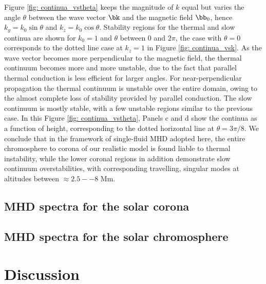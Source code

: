 Figure \ref{fig: continua_vstheta} keeps the magnitude of $k$ equal but varies the angle $\theta$ between the wave vector $\bk$ and the magnetic field $\bb_0$, hence $k_y = k_0\sin\theta$ and $k_z = k_0\cos\theta$. Stability regions for the thermal and slow continua are shown for $k_0 = 1$ and $\theta$ between 0 and $2\pi$, the case with $\theta = 0$ corresponds to the dotted line case at $k_z = 1$ in Figure \ref{fig: continua_vsk}. As the wave vector becomes more perpendicular to the magnetic field, the thermal continuum becomes more and more unstable, due to the fact that parallel thermal conduction is less efficient for larger angles. For near-perpendicular propagation the thermal continuum is unstable over the entire domain, owing to the almost complete loss of stability provided by parallel conduction. The slow continuum is mostly stable, with a few unstable regions similar to the previous case. In this Figure \ref{fig: continua_vstheta}, Panels c and d show the continua as a function of height, corresponding to the dotted horizontal line at $\theta = 3\pi/8$. We conclude that in the framework of single-fluid MHD adopted here, the entire chromosphere to corona of our realistic model is found liable to thermal instability, while the lower coronal regions in addition demonstrate slow continuum overstabilities, with corresponding travelling, singular modes at altitudes between $\approx 2.5 -- 8$ Mm.



\subsection{MHD spectra for the solar corona} \label{ss: corona_spectra}
\subsection{MHD spectra for the solar chromosphere} \label{ss: chromosphere_spectra}

\section{Discussion}



\cleardoublepage
